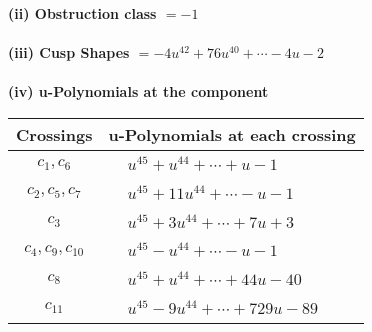 \documentclass[1p]{elsarticle_modified}
\theoremstyle{definition}
\begin{document}
\flushleft \textbf{(ii) Obstruction class $= -1$}\\~\\
\flushleft \textbf{(iii) Cusp Shapes $= -4 u^{42}+76 u^{40}+\cdots-4 u-2$}\\~\\
\newpage\renewcommand{\arraystretch}{1}
\flushleft \textbf{(iv) u-Polynomials at the component}\newline \\
\begin{tabular}{m{50pt}|m{274pt}}
Crossings & \hspace{64pt}u-Polynomials at each crossing \\
\hline $$\begin{aligned}c_{1},c_{6}\end{aligned}$$&$\begin{aligned}
&u^{45}+u^{44}+\cdots+u-1
\end{aligned}$\\
\hline $$\begin{aligned}c_{2},c_{5},c_{7}\end{aligned}$$&$\begin{aligned}
&u^{45}+11 u^{44}+\cdots- u-1
\end{aligned}$\\
\hline $$\begin{aligned}c_{3}\end{aligned}$$&$\begin{aligned}
&u^{45}+3 u^{44}+\cdots+7 u+3
\end{aligned}$\\
\hline $$\begin{aligned}c_{4},c_{9},c_{10}\end{aligned}$$&$\begin{aligned}
&u^{45}- u^{44}+\cdots- u-1
\end{aligned}$\\
\hline $$\begin{aligned}c_{8}\end{aligned}$$&$\begin{aligned}
&u^{45}+u^{44}+\cdots+44 u-40
\end{aligned}$\\
\hline $$\begin{aligned}c_{11}\end{aligned}$$&$\begin{aligned}
&u^{45}-9 u^{44}+\cdots+729 u-89
\end{aligned}$\\
\hline
\end{tabular}\\~\\
\end{document}
